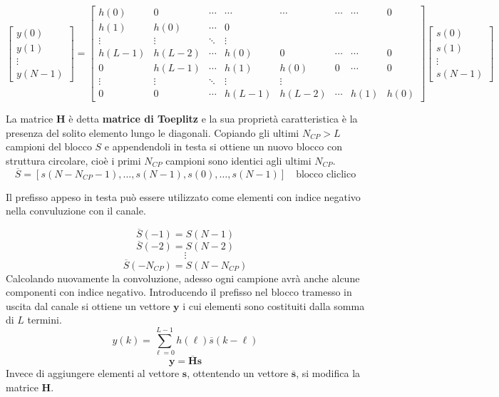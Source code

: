 \[ 
\begin{bmatrix} y(0) \\ y(1) \\ \vdots \\ y(N-1) \end{bmatrix} 
= 
\begin{bmatrix}
    h(0) & 0 & \cdots & \cdots & \cdots & \cdots & \cdots & 0 \\
    h(1) & h(0) & \cdots & 0 \\
    \vdots & \vdots & \ddots & \vdots \\
    h(L-1) & h(L-2) & \cdots & h(0) & 0 & \cdots & \cdots & 0 \\
    0 & h(L-1) & \cdots & h(1) & h(0) & 0 & \cdots & 0 \\
    \vdots & \vdots & \ddots & \vdots & \vdots \\
    0 & 0 & \cdots & h(L-1) & h(L-2) & \cdots & h(1) & h(0)
    \end{bmatrix}    
\begin{bmatrix} s(0) \\ s(1) \\ \vdots \\ s(N-1) \end{bmatrix}
\]

La matrice $\mathbf{H}$ è detta \textbf{matrice di Toeplitz} e la sua proprietà caratteristica è la presenza del solito elemento lungo le diagonali. Copiando gli ultimi $N_{CP} > L$ campioni del blocco $S$ e appendendoli in testa si ottiene un nuovo blocco con struttura circolare, cioè i primi $N_{CP}$ campioni sono identici agli ultimi $N_{CP}$.
\[
    \overline{S} = [s(N - N_{CP} - 1), \ldots, s(N - 1), s(0), \ldots, s(N - 1)] \quad \text{blocco cliclico}
\]

Il prefisso appeso in testa può essere utilizzato come elementi con indice negativo nella convuluzione con il canale.

\[
    \overline{S}(-1) = S(N - 1)
\]
\[
    \overline{S}(-2) = S(N - 2)
\]
\[
    \vdots
\]
\[
    \overline{S}(-N_{CP}) = S(N - N_{CP})
\]
Calcolando nuovamente la convoluzione, adesso ogni campione avrà anche alcune componenti con indice negativo.
Introducendo il prefisso nel blocco tramesso in uscita dal canale si ottiene un vettore $\mathbf{y}$ i cui elementi sono costituiti dalla somma di $L$ termini.
\[
    y(k) = \sum_{\ell=0}^{L-1} h(\ell) \overline{s}(k-\ell)
\]
\[
    \mathbf{y} = \mathbf{\overline{H}} \mathbf{s}
\]
Invece di aggiungere elementi al vettore $\mathbf{s}$, ottentendo un vettore $\mathbf{\overline{s}}$, si modifica la matrice $\mathbf{H}$.

